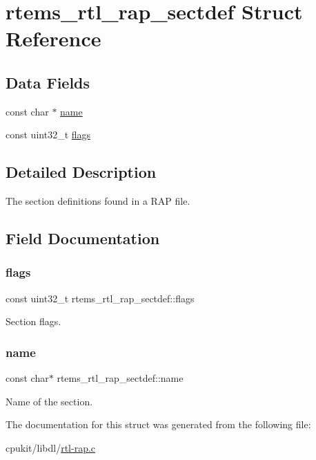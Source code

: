\hypertarget{structrtems__rtl__rap__sectdef}{}\section{rtems\+\_\+rtl\+\_\+rap\+\_\+sectdef Struct Reference}
\label{structrtems__rtl__rap__sectdef}
\subsection*{Data Fields}
\begin{DoxyCompactItemize}
\item 
const char $\ast$ \mbox{\hyperlink{structrtems__rtl__rap__sectdef_a2559237ae523532c8cac88d14b6d8100}{name}}
\item 
const uint32\+\_\+t \mbox{\hyperlink{structrtems__rtl__rap__sectdef_a2937cbdb15dbbdd91a8e28fd44b373dd}{flags}}
\end{DoxyCompactItemize}


\subsection{Detailed Description}
The section definitions found in a R\+AP file. 

\subsection{Field Documentation}
\mbox{\label{structrtems__rtl__rap__sectdef_a2937cbdb15dbbdd91a8e28fd44b373dd}} 
\subsubsection{\texorpdfstring{flags}{flags}}
{\footnotesize\ttfamily const uint32\+\_\+t rtems\+\_\+rtl\+\_\+rap\+\_\+sectdef\+::flags}

Section flags. \mbox{\label{structrtems__rtl__rap__sectdef_a2559237ae523532c8cac88d14b6d8100}} 
\subsubsection{\texorpdfstring{name}{name}}
{\footnotesize\ttfamily const char$\ast$ rtems\+\_\+rtl\+\_\+rap\+\_\+sectdef\+::name}

Name of the section. 

The documentation for this struct was generated from the following file\+:\begin{DoxyCompactItemize}
\item 
cpukit/libdl/\mbox{\hyperlink{rtl-rap_8c}{rtl-\/rap.\+c}}\end{DoxyCompactItemize}
